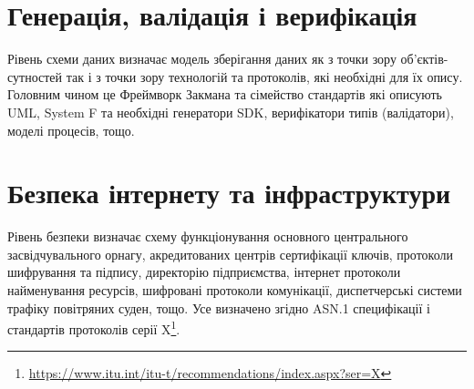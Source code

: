\newpage
\section{Генерація, валідація і верифікація}

Рівень схеми даних визначає модель зберігання даних як з точки зору об'єктів-сутностей
так і з точки зору технологій та протоколів, які необхідні для їх опису.
Головним чином це Фреймворк Закмана та сімейство стандартів які описують UML, System F
та необхідні генератори SDK, верифікатори типів (валідатори), моделі процесів, тощо.

\section{Безпека інтернету та інфраструктури}

Рівень безпеки визначає схему функціонування основного центрального засвідчувального орнагу,
акредитованих центрів сертифікації ключів, протоколи шифрування та підпису, директорію
підприємства, інтернет протоколи найменування ресурсів, шифровані протоколи комунікації,
диспетчерські системи трафіку повітряних суден, тощо. Усе визначено згідно ASN.1
специфікації і стандартів протоколів серії X\footnote{\url{https://www.itu.int/itu-t/recommendations/index.aspx?ser=X}}.
